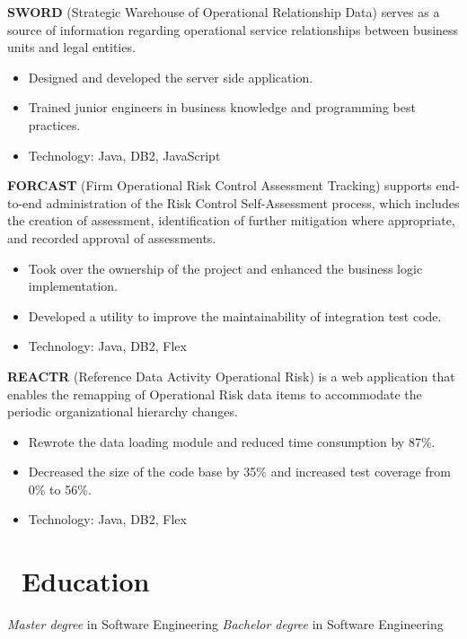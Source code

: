 \documentclass{resume}
\begin{document}
\textbf{SWORD} (Strategic Warehouse of Operational Relationship Data) serves as a source of information regarding operational service relationships between business units and legal entities.
\begin{itemize}
  \item Designed and developed the server side application.
  \item Trained junior engineers in business knowledge and programming best practices.
  \item Technology: Java, DB2, JavaScript
\end{itemize}


\textbf{FORCAST} (Firm Operational Risk Control Assessment Tracking) supports end-to-end administration of the Risk Control Self-Assessment process, which includes the creation of assessment, identification of further mitigation where appropriate, and recorded approval of assessments.
\begin{itemize}
  \item Took over the ownership of the project and enhanced the business logic implementation.
  \item Developed a utility to improve the maintainability of integration test code.
  \item Technology: Java, DB2, Flex
\end{itemize}

\textbf{REACTR} (Reference Data Activity Operational Risk) is a web application that enables the remapping of Operational Risk data items to accommodate the periodic organizational hierarchy changes.

\begin{itemize}
  \item Rewrote the data loading module and reduced time consumption by 87\%.
  \item Decreased the size of the code base by 35\% and increased test coverage from 0\% to 56\%.
  \item Technology: Java, DB2, Flex
\end{itemize}

\section{\faGraduationCap\ Education}
\textit{Master degree} in Software Engineering
\textit{Bachelor degree} in Software Engineering
\end{document}
